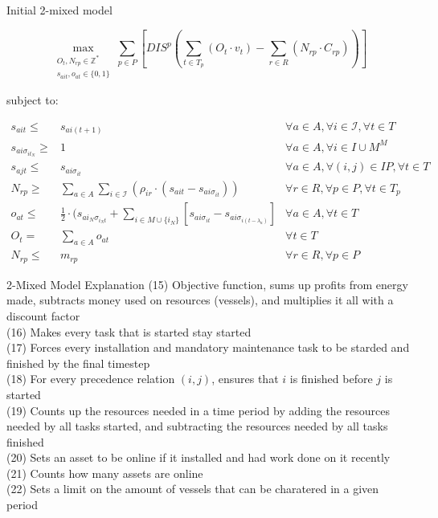 \documentclass{beamer}
\begin{document}
\begin{frame}{Initial 2-mixed model}
\scriptsize

\begin{equation}
	\max_{\substack{O_t, N_{rp} \in \mathbb{Z}^* \\ 
	s_{ait}, o_{at} \in \{0, 1\}}} 
	\sum_{p \in P} [ DIS^p (\sum_{t\in T_p} (O_t \cdot v_t)  - \sum_{r\in R} (N_{rp} \cdot C_{rp})) ]
\end{equation}

\bigskip

subject to:

\begin{align}
s_{ait} \leq& s_{ai(t+1)}																	& \forall a \in A, \forall i \in \mathcal{I}, \forall t \in T	\\
s_{ai\sigma_{it_N}} \geq& 1																& \forall a \in A, \forall i \in I\cup M^M			\\
s_{ajt} \leq& s_{ai\sigma_{it}}																& \forall a \in A, \forall (i, j) \in IP, \forall t \in T 	\\
N_{rp} \geq& \sum_{a\in A} \sum_{i\in \mathcal{I}} (\rho_{ir} \cdot (s_{ait} - s_{ai\sigma_{it}})) 						& \forall r \in R, \forall p \in P, \forall t \in T_p 		\\
o_{at} \leq& \frac{1}{2} \cdot (s_{ai_N\sigma_{i_Nt}} + \sum_{i \in M \cup \{i_N\}} [s_{ai\sigma_{it}} - s_{ai\sigma_{i(t-\lambda_a)}}]	& \forall a \in A, \forall t \in T			\\
O_t =& \sum_{a \in A} o_{at}																& \forall t \in T 						\\
N_{rp} \leq& m_{rp}																	& \forall r \in R, \forall p \in P
\end{align}

\end{frame}

\begin{frame}{2-Mixed Model Explanation}
(15) Objective function, sums up profits from energy made, subtracts money used on resources (vessels), and multiplies it all with a discount factor	\\
(16) Makes every task that is started stay started 	\\
(17) Forces every installation and mandatory maintenance task to be starded and finished by the final timestep	\\
(18) For every precedence relation $(i, j)$, ensures that $i$ is finished before $j$ is started 	\\
(19) Counts up the resources needed in a time period by adding the resources needed by all tasks started, and subtracting the resources needed by all tasks finished	\\
(20) Sets an asset to be online if it installed and had work done on it recently \\
(21) Counts how many assets are online \\
(22) Sets a limit on the amount of vessels that can be charatered in a given period
\end{frame}
\end{document}
